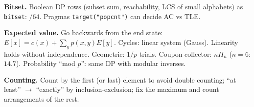 {\textbf{Bitset.} Boolean DP rows (subset sum, reachability, LCS of small
alphabets) as \texttt{bitset}: $/64$. Pragmas \texttt{target("popcnt")} can
decide AC vs TLE.

\textbf{Expected value.} Go backwards from the end state:
$E[x]=c(x)+\sum_y p(x,y)E[y]$. Cycles: linear system (Gauss).
Linearity holds without independence. Geometric: $1/p$ trials.
Coupon collector: $nH_n$ ($n=6$: $14.7$). Probability ``mod $p$'': same DP
with modular inverses.

\textbf{Counting.} Count by the first (or last) element to avoid double
counting; ``at least'' $\to$ ``exactly'' by inclusion-exclusion; fix the
maximum and count arrangements of the rest.
}
